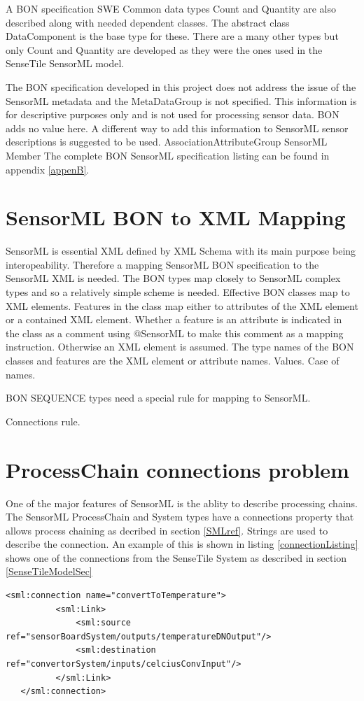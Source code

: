 \documentclass[]{final_report}
\begin{document}
A BON specification SWE Common data types Count and Quantity are also described along with needed dependent classes. The abstract class DataComponent is the base type for these. There are a many other types but only Count and Quantity are developed as they were the ones used in the SenseTile SensorML model.

The BON specification developed in this project does not address the issue of the SensorML metadata and the MetaDataGroup is not specified. This information is for descriptive purposes only and is not used for processing sensor data. BON adds no value here. A different way to add this information to SensorML sensor descriptions is suggested to be used.
AssociationAttributeGroup
SensorML
Member
The complete BON SensorML specification listing can be found in appendix \ref{appenB}.

\section{SensorML BON to XML Mapping}
SensorML is essential XML defined by XML Schema with its main purpose being interopeability. Therefore a mapping SensorML BON specification to the SensorML XML is needed. The BON types map closely to SensorML complex types and so a relatively simple scheme is needed.
Effective BON classes map to XML elements. Features in the class map either to attributes of the XML element or a contained XML element. Whether a feature is an attribute is indicated in the class as a comment using @SensorML to make this comment as a mapping instruction. Otherwise an XML element is assumed. The type names of the BON classes and features are the XML element or attribute names. Values. Case of names.

BON SEQUENCE types need a special rule for mapping to SensorML.

Connections rule.

\section{ProcessChain connections problem}
One of the major features of SensorML is the ablity to describe processing chains. The SensorML ProcessChain and System types have a connections property that allows process chaining as decribed in section \ref{SMLref}. Strings are used to describe the connection. An example of this is shown in listing \ref{connectionListing} shows one of the connections from the SenseTile System as described in section \ref{SenseTileModelSec}
\begin{lstlisting}[label=connectionListing,caption=SenseTile System connectionconvertToTemperature]
   <sml:connection name="convertToTemperature">
          <sml:Link>
              <sml:source ref="sensorBoardSystem/outputs/temperatureDNOutput"/>
              <sml:destination ref="convertorSystem/inputs/celciusConvInput"/>
          </sml:Link>
   </sml:connection>

\end{lstlisting}
\end{document}

